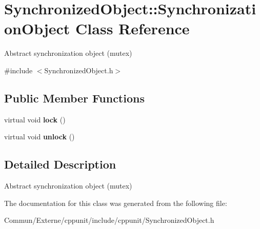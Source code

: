 \hypertarget{class_synchronized_object_1_1_synchronization_object}{}\section{Synchronized\+Object\+:\+:Synchronization\+Object Class Reference}
\label{class_synchronized_object_1_1_synchronization_object}


Abstract synchronization object (mutex)  




{\ttfamily \#include $<$Synchronized\+Object.\+h$>$}

\subsection*{Public Member Functions}
\begin{DoxyCompactItemize}
\item 
virtual void {\bfseries lock} ()\hypertarget{class_synchronized_object_1_1_synchronization_object_a2c1a4b7e3e3a8f8993140fb1fc9dabe0}{}\label{class_synchronized_object_1_1_synchronization_object_a2c1a4b7e3e3a8f8993140fb1fc9dabe0}

\item 
virtual void {\bfseries unlock} ()\hypertarget{class_synchronized_object_1_1_synchronization_object_a2af2a59901a0cdc673dc8729840fe797}{}\label{class_synchronized_object_1_1_synchronization_object_a2af2a59901a0cdc673dc8729840fe797}

\end{DoxyCompactItemize}


\subsection{Detailed Description}
Abstract synchronization object (mutex) 

The documentation for this class was generated from the following file\+:\begin{DoxyCompactItemize}
\item 
Commun/\+Externe/cppunit/include/cppunit/Synchronized\+Object.\+h\end{DoxyCompactItemize}
